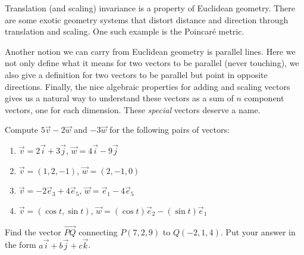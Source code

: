 \begin{remark}
	Translation (and scaling) invariance is a property of Euclidean geometry. There are some exotic geometry systems that distort distance and direction through translation and scaling. One such example is the Poincar\'e metric.
\end{remark}
Another notion we can carry from Euclidean geometry is parallel lines. Here we not only define what it means for two vectors to be parallel (never touching), we also give a definition for two vectors to be parallel but point in opposite directions.
%
Finally, the nice algebraic properties for adding and scaling vectors gives us a natural way to understand these vectors as a sum of $n$ component vectors, one for each dimension. These \textit{special} vectors deserve a name.
\ \\
\exercises
\begin{exerciselist}
	\item Compute $5\vec{v}-2\vec{w}$ and $-3\vec{w}$ for the following pairs of vectors: \begin{enumerate}[label=(\alph*)]
		\item $\vec{v}=2\vec{i}+3\vec{j}$, $\vec{w}=4\vec{i}-9\vec{j}$
		\item $\vec{v}=(1,2,-1)$, $\vec{w}=(2,-1,0)$
		\item $\vec{v}=-2\vec{e}_3+4\vec{e}_5$, $\vec{w}=\vec{e}_1 -4\vec{e}_5$
		\item $\vec{v}=(\cos t, \sin t)$, $\vec{w}=(\cos t)\vec{e}_2 - (\sin t) \vec{e}_1$
	\end{enumerate}
	\item Find the vector $\overrightarrow{PQ}$ connecting $P(7,2,9)$ to $Q(-2,1,4)$. Put your answer in the form $a\vec{i}+b\vec{j}+c\vec{k}$.
\end{exerciselist}
